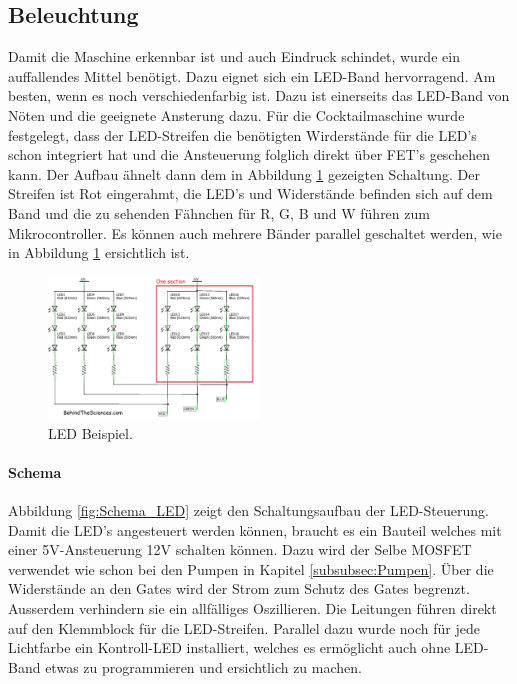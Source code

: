 \subsection{Beleuchtung}
\label{subsec:Beleuchtung_2}

Damit die Maschine erkennbar ist und auch Eindruck schindet, wurde ein auffallendes Mittel benötigt. Dazu eignet sich ein LED-Band hervorragend. Am besten, wenn es noch verschiedenfarbig ist. Dazu ist einerseits das LED-Band von Nöten und die geeignete Ansterung dazu. Für die Cocktailmaschine wurde festgelegt, dass der LED-Streifen die benötigten Wirderstände für die LED's schon integriert hat und die Ansteuerung folglich direkt über FET's geschehen kann. Der Aufbau ähnelt dann dem in Abbildung \ref{fig:LED1} gezeigten Schaltung. Der Streifen ist Rot eingerahmt, die LED's und Widerstände befinden sich auf dem Band und die zu sehenden Fähnchen für R, G, B und W führen zum Mikrocontroller. Es können auch mehrere Bänder parallel geschaltet werden, wie in Abbildung \ref{fig:LED1} ersichtlich ist.

\begin{figure}[h!]
\center
\includegraphics[width = 0.5\textwidth]{graphics/Schema_LED1}
\caption{LED Beispiel. \cite{behindthesciences_rgb_2017}}
\label{fig:LED1}
\end{figure}

\paragraph{Schema}\mbox{}

Abbildung \ref{fig:Schema_LED} zeigt den Schaltungsaufbau der LED-Steuerung. Damit die LED's angesteuert werden können, braucht es ein Bauteil welches mit einer 5V-Ansteuerung 12V schalten können. Dazu wird der Selbe MOSFET verwendet wie schon bei den Pumpen in Kapitel \ref{subsubsec:Pumpen}. Über die Widerstände an den Gates wird der Strom zum Schutz des Gates begrenzt. Ausserdem verhindern sie ein allfälliges Oszillieren. Die Leitungen führen direkt auf den Klemmblock für die LED-Streifen. Parallel dazu wurde noch für jede Lichtfarbe ein Kontroll-LED installiert, welches es ermöglicht auch ohne LED-Band etwas zu programmieren und ersichtlich zu machen.

